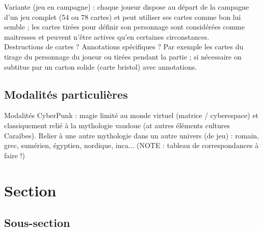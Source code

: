 \documentclass[11pt,twoside,a4paper]{article}
\begin{document}
Variante (jeu en campagne) : chaque joueur dispose au d{\'e}part de la campagne d'un jeu complet (54 ou 78 cartes) et peut utiliser ses cartes comme bon lui semble ; les cartes tir{\'e}es pour d{\'e}finir son personnage sont consid{\'e}r{\'e}es comme maitresses et peuvent n'{\^e}tre actives qu'en certaines circonstances.~\\

Destructions de cartes ? Annotations sp{\'e}cifiques ? Par exemple les cartes du tirage du personnage du joueur ou tir{\'e}es pendant la partie ; si n{\'e}cessaire on subtitue par un carton solide (carte bristol) avec annotations.~\\

\subsection{Modalit{\'e}s particuli{\`e}res}

Modalit{\'e}s CyberPunk : magie limit{\'e} au monde virtuel (matrice / cyberespace) et classiquement reli{\'e} {\`a} la mythologie vaudoue (at autres {\'e}l{\'e}ments cultures Cara{\"i}bes). 
Relier {\`a} une autre mythologie dans un autre univers (de jeu) : romain, grec, sum{\'e}rien, {\'e}gyptien, nordique, inca... (NOTE : tableau de correspondances {\`a} faire !)



\clearpage


\section{Section}



\subsection{Sous-section}
\end{document}
